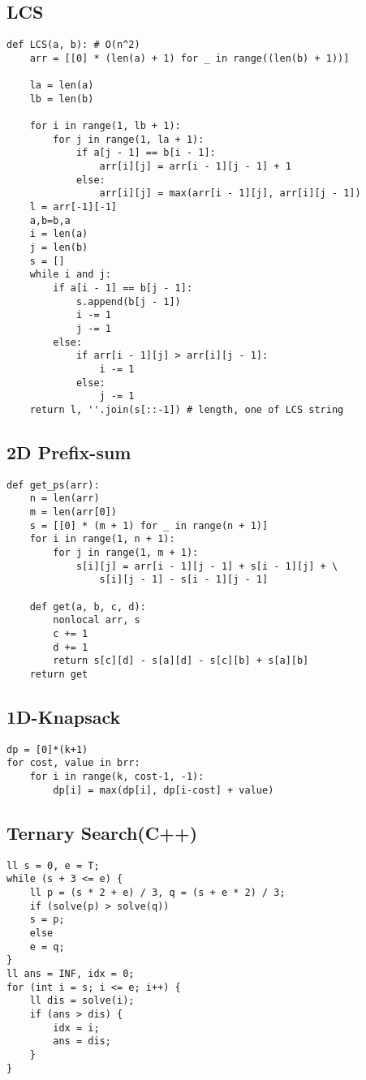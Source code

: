 \documentclass[landscape, 8pt, a4paper, oneside, twocolumn]{extarticle}
\begin{document}
\subsection{LCS}
\begin{verbatim}
def LCS(a, b): # O(n^2)
    arr = [[0] * (len(a) + 1) for _ in range((len(b) + 1))]

    la = len(a)
    lb = len(b)

    for i in range(1, lb + 1):
        for j in range(1, la + 1):
            if a[j - 1] == b[i - 1]:
                arr[i][j] = arr[i - 1][j - 1] + 1
            else:
                arr[i][j] = max(arr[i - 1][j], arr[i][j - 1])
    l = arr[-1][-1]
    a,b=b,a
    i = len(a)
    j = len(b)
    s = []
    while i and j:
        if a[i - 1] == b[j - 1]:
            s.append(b[j - 1])
            i -= 1
            j -= 1
        else:
            if arr[i - 1][j] > arr[i][j - 1]:
                i -= 1
            else:
                j -= 1
    return l, ''.join(s[::-1]) # length, one of LCS string
\end{verbatim}
\subsection{2D Prefix-sum}
\begin{verbatim}
def get_ps(arr):
    n = len(arr)
    m = len(arr[0])
    s = [[0] * (m + 1) for _ in range(n + 1)]
    for i in range(1, n + 1):
        for j in range(1, m + 1):
            s[i][j] = arr[i - 1][j - 1] + s[i - 1][j] + \
                s[i][j - 1] - s[i - 1][j - 1]

    def get(a, b, c, d):
        nonlocal arr, s
        c += 1
        d += 1
        return s[c][d] - s[a][d] - s[c][b] + s[a][b]
    return get
\end{verbatim}

\subsection{1D-Knapsack}
\begin{verbatim}
dp = [0]*(k+1)
for cost, value in brr:
    for i in range(k, cost-1, -1):
        dp[i] = max(dp[i], dp[i-cost] + value)
\end{verbatim}

\subsection{Ternary Search(C++)}
\begin{verbatim}
ll s = 0, e = T;
while (s + 3 <= e) {
	ll p = (s * 2 + e) / 3, q = (s + e * 2) / 3;
	if (solve(p) > solve(q))
	s = p;
	else
	e = q;
}
ll ans = INF, idx = 0;
for (int i = s; i <= e; i++) {
	ll dis = solve(i);
	if (ans > dis) {
		idx = i;
		ans = dis;
	}
}
\end{verbatim}
\end{document}

